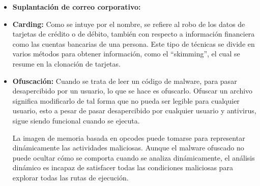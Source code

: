 \begin{itemize}
  \item \textbf{Suplantación de correo corporativo:}

  \item \textbf{Carding:}
    Como se intuye por el nombre, se refiere al robo de los datos de tarjetas de
    crédito o de débito, también con respecto a información financiera como las
    cuentas bancarias de una persona. Este tipo de técnicas se divide en varios
    métodos para obtener información, como el ``skimming'', el cual se resume en
    la clonación de tarjetas. \parencite{Mosquera2019}

  \item \textbf{Ofuscación:}
    Cuando se trata de leer un código de malware, para pasar desapercibido por
    un usuario, lo que se hace es ofuscarlo. Ofuscar un archivo significa
    modificarlo de tal forma que no pueda ser legible para cualquier usuario,
    esto a pesar de pasar desapercibido por cualquier usuario y antivirus, sigue
    siendo funcional cuando se ejecuta.
    \begin{displayquote}
      La imagen de memoria basada en opcodes puede tomarse para representar
      dinámicamente las actividades maliciosas. Aunque el malware ofuscado no
      puede ocultar cómo se comporta cuando se analiza dinámicamente, el
      análisis dinámico es incapaz de satisfacer todas las condiciones
      maliciosas para explorar todas las rutas de ejecución.
      \parencite{Aboaoja2022}
    \end{displayquote}
\end{itemize}

